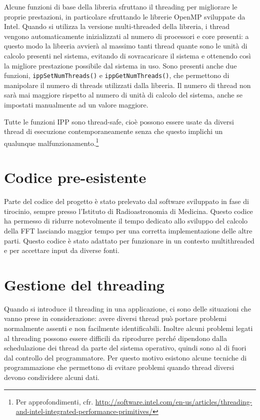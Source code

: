Alcune funzioni di base della libreria sfruttano il threading per migliorare le
proprie prestazioni, in particolare sfruttando le librerie OpenMP sviluppate da
Intel. Quando si utilizza la versione multi-threaded della libreria, i thread
vengono automaticamente inizializzati al numero di processori e core presenti: a
questo modo la libreria avvier\`a al massimo tanti thread quante sono le unit\`a
di calcolo presenti nel sistema, evitando di sovracaricare il sistema e
ottenendo cos\`i la migliore prestazione possibile dal sistema in uso. Sono
presenti anche due funzioni, \texttt{ippSetNumThreads()} e
\texttt{ippGetNumThreads()}, che permettono di manipolare il numero di threads
utilizzati dalla libreria. Il numero di thread non sar\`a mai maggiore rispetto
al numero di unit\`a di calcolo del sistema, anche se impostati manualmente ad
un valore maggiore.

Tutte le funzioni IPP sono thread-safe, cio\`e possono essere usate da diversi
thread di esecuzione contemporaneamente senza che questo implichi un qualunque
malfunzionamento.\footnote{Per approfondimenti, cfr.
\url{http://software.intel.com/en-us/articles/threading-and-intel-integrated-performance-primitives/}}


\section{Codice pre-esistente}
Parte del codice del progetto \`e stato prelevato dal software sviluppato in
fase di tirocinio, sempre presso l'Istituto di Radioastronomia di Medicina.
Questo codice ha permesso di ridurre notevolmente il tempo dedicato allo
sviluppo del calcolo della \ac{FFT} lasciando maggior tempo per una corretta
implementazione delle altre parti. Questo codice \`e stato adattato per
funzionare in un contesto multithreaded e per accettare input da diverse fonti.

\section{Gestione del threading}
Quando si introduce il threading in una applicazione, ci sono delle situazioni
che vanno prese in considerazione: avere diversi thread pu\`o portare problemi
normalmente assenti e non facilmente identificabili. Inoltre alcuni problemi
legati al threading possono essere difficili da riprodurre perch\'e  dipendono
dalla schedulazione dei thread da parte del sistema operativo, quindi sono al di
fuori dal controllo del programmatore. Per questo motivo esistono alcune
tecniche di programmazione che permettono di evitare problemi quando thread
diversi devono condividere alcuni dati.
